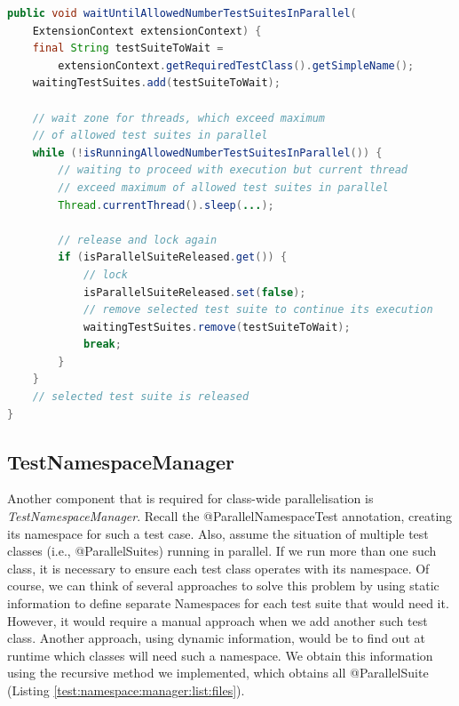 \begin{lstlisting}[language=Java,label=parallel:suite:sync,caption=Additional synchronization for multiple @ParallelSuite\, that exceed our configured parallelism limit and are spawned by ForkJoinPool,frame=tb]
public void waitUntilAllowedNumberTestSuitesInParallel(
    ExtensionContext extensionContext) {
    final String testSuiteToWait =
        extensionContext.getRequiredTestClass().getSimpleName();
    waitingTestSuites.add(testSuiteToWait);

    // wait zone for threads, which exceed maximum
    // of allowed test suites in parallel
    while (!isRunningAllowedNumberTestSuitesInParallel()) {
        // waiting to proceed with execution but current thread
        // exceed maximum of allowed test suites in parallel
        Thread.currentThread().sleep(...);

        // release and lock again
        if (isParallelSuiteReleased.get()) {
            // lock
            isParallelSuiteReleased.set(false);
            // remove selected test suite to continue its execution
            waitingTestSuites.remove(testSuiteToWait);
            break;
        }
    }
    // selected test suite is released
}
\end{lstlisting}

\subsection{TestNamespaceManager}
\label{05:class:wide:test:namespace:manager}

Another component that is required for class-wide parallelisation is \emph{TestNamespaceManager}.
Recall the @ParallelNamespaceTest annotation, creating its namespace for such a test case.
Also, assume the situation of multiple test classes (i.e., @ParallelSuites) running in parallel.
If we run more than one such class, it is necessary to ensure each test class operates with its namespace.
Of course, we can think of several approaches to solve this problem by using static information to define separate Namespaces
for each test suite that would need it. However, it would require a manual approach when we add another such test class.
Another approach, using dynamic information, would be to find out at runtime which classes will need such a namespace.
We obtain this information using the recursive method we implemented, which obtains all @ParallelSuite (Listing \ref{test:namespace:manager:list:files}).

